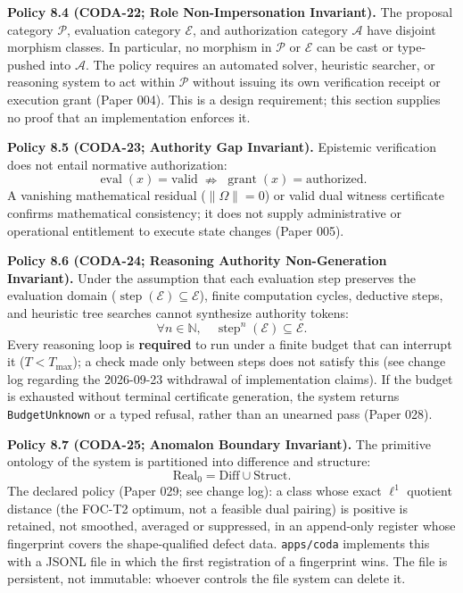 \documentclass[
  11pt,
]{article}
\begin{document}
\textbf{Policy 8.4 (CODA-22; Role Non-Impersonation Invariant).} The proposal category \(\mathcal{P}\), evaluation category \(\mathcal{E}\), and authorization category \(\mathcal{A}\) have disjoint morphism classes. In particular, no morphism in \(\mathcal{P}\) or \(\mathcal{E}\) can be cast or type-pushed into \(\mathcal{A}\). The policy requires an automated solver, heuristic searcher, or reasoning system to act within \(\mathcal{P}\) without issuing its own verification receipt or execution grant (Paper 004). This is a design requirement; this section supplies no proof that an implementation enforces it.

\textbf{Policy 8.5 (CODA-23; Authority Gap Invariant).} Epistemic verification does not entail normative authorization: \[
 \operatorname{eval}(x) = \mathrm{valid} \;\nRightarrow\; \operatorname{grant}(x) = \mathrm{authorized}.
\] A vanishing mathematical residual (\(\|\Omega\| = 0\)) or valid dual witness certificate confirms mathematical consistency; it does not supply administrative or operational entitlement to execute state changes (Paper 005).

\textbf{Policy 8.6 (CODA-24; Reasoning Authority Non-Generation Invariant).} Under the assumption that each evaluation step preserves the evaluation domain (\(\operatorname{step}(\mathcal{E}) \subseteq \mathcal{E}\)), finite computation cycles, deductive steps, and heuristic tree searches cannot synthesize authority tokens: \[
 \forall n \in \mathbb{N},\quad \operatorname{step}^n(\mathcal{E}) \subseteq \mathcal{E}.
\] Every reasoning loop is \textbf{required} to run under a finite budget that can interrupt it (\(T < T_{\max}\)); a check made only between steps does not satisfy this (see change log regarding the 2026-09-23 withdrawal of implementation claims). If the budget is exhausted without terminal certificate generation, the system returns \texttt{BudgetUnknown} or a typed refusal, rather than an unearned pass (Paper 028).

\textbf{Policy 8.7 (CODA-25; Anomalon Boundary Invariant).} The primitive ontology of the system is partitioned into difference and structure: \[
 \mathrm{Real}_0 = \text{Diff} \cup \text{Struct}.
\] The declared policy (Paper 029; see change log): a class whose exact \(\ell^1\) quotient distance (the FOC-T2 optimum, not a feasible dual pairing) is positive is retained, not smoothed, averaged or suppressed, in an append-only register whose fingerprint covers the shape-qualified defect data. \texttt{apps/coda} implements this with a JSONL file in which the first registration of a fingerprint wins. The file is persistent, not immutable: whoever controls the file system can delete it.
\end{document}

